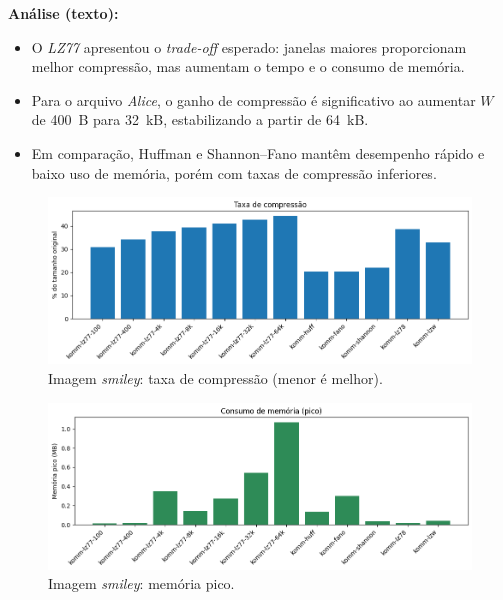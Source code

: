 \noindent\textbf{Análise (texto):}
\begin{itemize}
  \item O \textit{LZ77} apresentou o \emph{trade-off} esperado: janelas maiores proporcionam melhor compressão, mas aumentam o tempo e o consumo de memória.
  \item Para o arquivo \textit{Alice}, o ganho de compressão é significativo ao aumentar \(W\) de 400~B para 32~kB, estabilizando a partir de 64~kB.
  \item Em comparação, Huffman e Shannon--Fano mantêm desempenho rápido e baixo uso de memória, porém com taxas de compressão inferiores.
\end{itemize}

\begin{figure}[htp]
  \centering
  \caption{Imagem \textit{smiley}: taxa de compressão (menor é melhor).}
  \label{fig:komm-smiley-compression}
  \includegraphics[width=15cm]{figuras/komm_smiley_compression.png}
\end{figure}

\begin{figure}[htp]
  \centering
  \caption{Imagem \textit{smiley}: memória pico.}
  \label{fig:komm-smiley-memory}
  \includegraphics[width=15cm]{figuras/komm_smiley_memory.png}
\end{figure}

